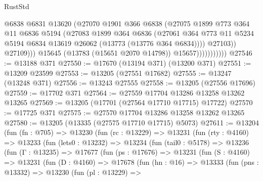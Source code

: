 \begin{lexlean}{RustStd}
\begin{coremodule}
                                @6838
                                @6831
                                @13620
                                (@27070
                                  @1901
                                  @366
                                  @6838
                                  (@27075
                                    @1899
                                    @773
                                    @364
                                    @11
                                    @6836
                                    @5194
                                    (@27083
                                      @1899
                                      @364
                                      @6836
                                      (@27061
                                        @364
                                        @773
                                        @11
                                        @5234
                                        @5194
                                        @6834
                                        @13619
                                        @26062
                                        (@13773 (@13776 @364 @6834))))
                                    @27103))
                                @27109)))
                          @15645
                          (@13783 (@15651 @2070 @14798))
                          @15657)))))))))))
@27546 := @13188 @371
@27550 := @17670 (@13194 @371) (@13200 @371)
@27551 := @13209 @23599
@27553 := @13205 (@27551 @17682)
@27555 := @13247 (@13248 @371)
@27556 := @13243 @27555
@27558 := @13205 (@27556 @17696)
@27559 := @17702 @371
@27564 := @27559 @17704 @13286 @13258 @13262 @13265
@27569 := @13205 (@17701 (@27564 @17710 @17715) @17722)
@27570 := @17725 @371
@27575 := @27570 @17704 @13286 @13258 @13262 @13265
@27580 := @13205 (@13335 (@27575 @17710 @17715) @5073)
@27611 := @13204
    (fun (fn : @705) =>
    @13230
      (fun (rc : @13229) =>
      @13231
        (fun (rty : @4160) =>
        @13233
          (fun (lets0 : @13232) =>
          @13234
            (fun (tail0 : @5178) =>
            @13236
              (fun (Γ : @13235) =>
              @17677
                (fun (ps : @17676) =>
                @13231
                  (fun (S : @4160) =>
                  @13231
                    (fun (D : @4160) =>
                    @17678
                      (fun (hn : @16) =>
                      @13333
                        (fun (pns : @13332) =>
                        @13230
                          (fun (pl : @13229) =>

\end{coremodule}
\end{lexlean}
